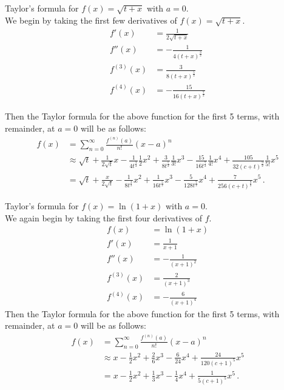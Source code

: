 \documentclass[12pt]{book}
\newenvironment{exercise}[2][Exercise]{\begin{trivlist}
\item[\hskip \labelsep {\bfseries #1}\hskip \labelsep {\bfseries #2.}]}{\end{trivlist}}
\begin{document}
\begin{exercise}{6.5.5}
Taylor's formula for $f(x) = \sqrt{ t+x}$ with $a=0$. \\

We begin by taking the first few derivatives of $f(x) = \sqrt{t+x}$.
    \begin{align*}
    f'(x) &= \frac{1}{2 \sqrt{t + x}} \\
    f''(x) &= - \frac{1}{4 \left(t + x\right)^{\frac{3}{2}}} \\
    f^{(3)} (x) &= \frac{3}{8 \left(t + x\right)^{\frac{5}{2}}} \\
    f^{(4)} (x) &= - \frac{15}{16 \left(t + x\right)^{\frac{7}{2}}}
    \end{align*}
    
    Then the Taylor formula for the above function for the first 5 terms, with remainder, at $a=0$ will be as follows:
    \begin{align*}
    f(x) &= \sum_{n=0}^\infty \frac{f^{(n)}(a)}{n!} (x-a)^n \\
    &\approx \sqrt{t} + \frac{1}{2 \sqrt{t}} x - \frac{1}{4 t^{\frac{3}{2}}}\frac{1}{2} x^2 + \frac{3}{8 t^{\frac{5}{2}}}  \frac{1}{3!}  x^3 - \frac{15}{16 t^{\frac{7}{2}}} \frac{1}{4!}  x^4 + \frac{105}{32 \left(c + t\right)^{\frac{9}{2}}} \frac{1}{5!} x^5 \\
    &= \sqrt{t} + \frac{x}{2 \sqrt{t}} - \frac{1}{8 t^{\frac{3}{2}}} x^2 + \frac{1}{16 t^\frac{5}{2}} x^3 - \frac{5}{128 t^\frac{7}{2}} x^4 + \frac{7}{256 \left(c+t\right)^\frac{9}{2}} x^5 \,.
    \end{align*}
\end{exercise}




\begin{exercise}{6.5.7}
Taylor's formula for $f(x) =\ln (1+x)$ with $a=0$.  \\

We again begin by taking the first four derivatives of $f$.
    \begin{align*}
    f(x) &= \ln (1+x) \\
    f'(x) &= \frac{1}{x + 1} \\
    f''(x) &= - \frac{1}{\left(x + 1\right)^{2}} \\
    f^{(3)} (x) &= \frac{2}{\left(x + 1\right)^{3}} \\
    f^{(4)} (x) &= - \frac{6}{\left(x + 1\right)^{4}}
    \end{align*} 
    Then the Taylor formula for the above function for the first 5 terms, with remainder, at $a=0$ will be as follows: 
    \begin{align*}
    f(x) &= \sum_{n=0}^\infty \frac{f^{(n)}(a)}{n!} (x-a)^n \\ 
    &\approx x - \frac{1}{2} x^2 + \frac{2}{6} x^3 - \frac{6}{24} x^4 + \frac{24}{120\left(c+1\right)^5} x^5 \\
    &= x - \frac{1}{2} x^2 + \frac{1}{3} x^3 - \frac{1}{4} x^4 + \frac{1}{5 \left(c+1\right)^5} x^5 \,.
    \end{align*}
\end{exercise}
\end{document}
